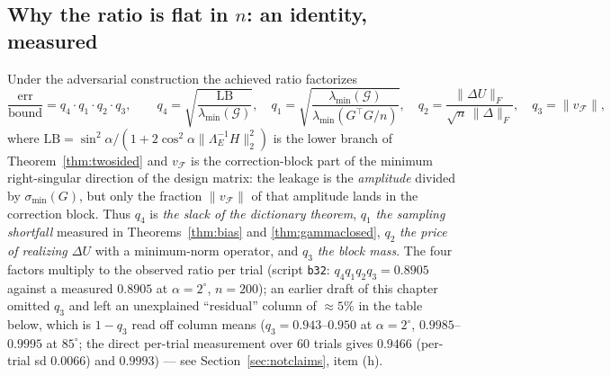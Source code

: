 \documentclass[11pt]{article}
\theoremstyle{remark}
\newcommand{\Gr}{\mathcal{G}}
\newcommand{\Le}{\Lambda_E}
\newcommand{\Cnorm}{\bigl\|\Le^{-1}H\bigr\|_2^2}
\newcommand{\minr}[1]{\sigma_{\min}(#1)}
\begin{document}
\subsection{Why the ratio is flat in $n$: an identity, measured}
\label{sec:cancellation}

Under the adversarial construction the achieved ratio factorizes
\begin{equation}\label{eq:factor}
  \frac{\text{err}}{\text{bound}}=q_4\cdot q_1\cdot q_2\cdot q_3,\qquad
  q_4=\sqrt{\frac{\mathrm{LB}}{\lambda_{\min}(\Gr)}},\quad
  q_1=\sqrt{\frac{\lambda_{\min}(\Gr)}{\lambda_{\min}(G^{\top}G/n)}},\quad
  q_2=\frac{\|\Delta U\|_F}{\sqrt n\,\|\Delta\|_F},\quad
  q_3=\|v_{\mathcal F}\| ,
\end{equation}
where $\mathrm{LB}=\sin^2\alpha/(1+2\cos^2\alpha\Cnorm)$ is the lower branch of
Theorem~\ref{thm:twosided} and $v_{\mathcal F}$ is the correction-block part of the
minimum right-singular direction of the design matrix: the leakage is the
\emph{amplitude} divided by $\minr G$, but only the fraction $\|v_{\mathcal F}\|$ of that
amplitude lands in the correction block. Thus $q_4$ is \emph{the slack of the dictionary
theorem}, $q_1$ \emph{the sampling shortfall} measured in Theorems~\ref{thm:bias} and
\ref{thm:gammaclosed}, $q_2$ \emph{the price of realizing $\Delta U$} with a
minimum-norm operator, and $q_3$ \emph{the block mass}. The four factors multiply to the
observed ratio per trial (script \texttt{b32}: $q_4q_1q_2q_3=0.8905$ against a measured
$0.8905$ at $\alpha=2^\circ$, $n=200$); an earlier draft of this chapter omitted $q_3$
and left an unexplained ``residual'' column of $\approx5\%$ in the table below, which is
$1-q_3$ read off column means ($q_3=0.943$--$0.950$ at $\alpha=2^\circ$,
$0.9985$--$0.9995$ at $85^\circ$; the direct per-trial measurement over $60$ trials gives
$0.9466$ (per-trial sd $0.0066$) and
$0.9993$) --- see Section~\ref{sec:notclaims}, item (h).
\end{document}

